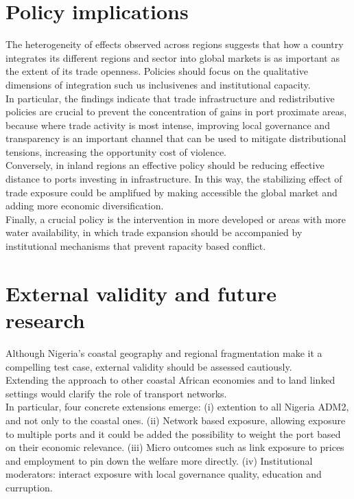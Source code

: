 \section{Policy implications}
The heterogeneity of effects observed across regions suggests that how a country integrates its different regions and sector into global markets is as important as the extent of its trade openness. Policies should focus on the qualitative dimensions of integration such us inclusivenes and institutional capacity. \\

In particular, the findings indicate that trade infrastructure and redistributive policies are crucial to prevent the concentration of gains in port proximate areas, because where trade activity is most intense, improving local governance and transparency is an important channel that can be used to mitigate distributional tensions, increasing the opportunity cost of violence. \\
Conversely, in inland regions an effective policy should be reducing effective distance to ports investing in infrastructure. In this way, the stabilizing effect of trade exposure could be amplifued by making accessible the global market and adding more economic diversification. \\
Finally, a crucial policy is the intervention in more developed or areas with more water availability, in which trade expansion should be accompanied by institutional mechanisms that prevent rapacity based conflict.\\

\section{External validity and future research}
Although Nigeria’s coastal geography and regional fragmentation make it a compelling test case, external validity should be assessed cautiously. \\
Extending the approach to other coastal African economies and to land linked settings would clarify the role of transport networks. \\
In particular, four concrete extensions emerge: (i) extention to all Nigeria ADM2, and not only to the coastal ones. (ii) Network based exposure, allowing exposure to multiple ports and it could be added the possibility to weight the port based on their economic relevance. 
(iii) Micro outcomes such as link exposure to prices and employment to pin down the welfare more directly. 
(iv) Institutional moderators: interact exposure with local governance quality, education and curruption.


